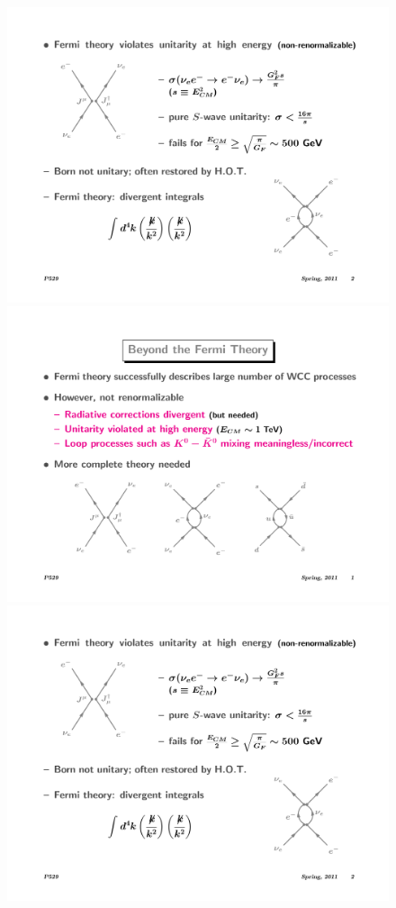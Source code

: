 \begin{figure}
\begin{center}
\includegraphics[width=.25\textwidth]{pics/fermi_theory}
\includegraphics[width=.25\textwidth]{pics/fermi_diverge_ds}
\includegraphics[width=.25\textwidth]{pics/fermi_divergence}
\end{center}
\caption{}
\label{fig:fermi_divergence}
\end{figure}

